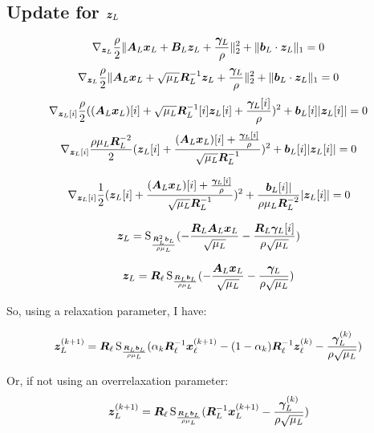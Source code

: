 \documentclass{article}
\begin{document}
\subsection{Update for $\bm{z}_L$}
\begin{equation}
\nabla_{\bm{z}_L} \frac{\rho}{2}\|\bm{A}_L\bm{x}_L + \bm{B}_L\bm{z}_L + \frac{\bm{\gamma}_L}{\rho}\|_2^2 + \|\bm{b}_L\cdot \bm{z}_L\|_1 = 0
\end{equation}
\begin{equation}
\nabla_{\bm{z}_L} \frac{\rho}{2}\|\bm{A}_L\bm{x}_L + \sqrt{\mu_L}\bm{R}_L^{-1}\bm{z}_L + \frac{\bm{\gamma}_L}{\rho}\|_2^2 + \|\bm{b}_L\cdot \bm{z}_L\|_1 = 0
\end{equation}
\begin{equation}
\nabla_{\bm{z}_L[i]} \frac{\rho}{2}((\bm{A}_L\bm{x}_L)[i] + \sqrt{\mu_L}\bm{R}_L^{-1}[i]\bm{z}_L[i] + \frac{\bm{\gamma}_L[i]}{\rho})^2 + \bm{b}_L[i]|\bm{z}_L[i]| = 0
\end{equation}
\begin{equation}
\nabla_{\bm{z}_L[i]} \frac{\rho\mu_L\bm{R}_L^{-2}}{2}(\bm{z}_L[i] + \frac{(\bm{A}_L\bm{x}_L)[i] + \frac{\bm{\gamma}_L[i]}{\rho}}{\sqrt{\mu_L}\bm{R}_L^{-1}})^2 + \bm{b}_L[i]|\bm{z}_L[i]| = 0
\end{equation}

\begin{equation}
\nabla_{\bm{z}_L[i]} \frac{1}{2}(\bm{z}_L[i] + \frac{(\bm{A}_L\bm{x}_L)[i] + \frac{\bm{\gamma}_L[i]}{\rho}}{\sqrt{\mu_L}\bm{R}_L^{-1}})^2 + \frac{\bm{b}_L[i]|}{\rho\mu_L\bm{R}_L^{-2}}|\bm{z}_L[i]| = 0
\end{equation}

\begin{equation}
\bm{z}_L = \operatorname{S}_{\frac{\bm{R}_L^2\bm{b}_L}{\rho\mu_L}}(-\frac{\bm{R}_L\bm{A}_L\bm{x}_L}{\sqrt{\mu_L}} - \frac{\bm{R}_L\bm{\gamma}_L[i]}{\rho\sqrt{\mu_L}})
\end{equation}

\begin{equation}
\bm{z}_L = \bm{R}_{\ell}\operatorname{S}_{\frac{\bm{R}_L\bm{b}_L}{\rho\mu_L}}(-\frac{\bm{A}_L\bm{x}_L}{\sqrt{\mu_L}} - \frac{\bm{\gamma}_L}{\rho\sqrt{\mu_L}})
\end{equation}

So, using a relaxation parameter, I have:

\begin{equation}
\bm{z}_L^{(k + 1)} = \bm{R}_{\ell}\operatorname{S}_{\frac{\bm{R}_L\bm{b}_L}{\rho\mu_L}}(\alpha_k\bm{R}_{\ell}^{-1}\bm{x}_{\ell}^{(k + 1)} - (1 - \alpha_k)\bm{R}_{\ell}^{-1}\bm{z}_{\ell}^{(k)} - \frac{\bm{\gamma}_L^{(k)}}{\rho\sqrt{\mu_L}})
\end{equation}

Or, if not using an overrelaxation parameter:
\begin{equation}
\bm{z}_L^{(k + 1)} = \bm{R}_{\ell}\operatorname{S}_{\frac{\bm{R}_L\bm{b}_L}{\rho\mu_L}}(\bm{R}_L^{-1}\bm{x}_L^{(k + 1)} - \frac{\bm{\gamma}_L^{(k)}}{\rho\sqrt{\mu_L}})
\end{equation}
\end{document}
